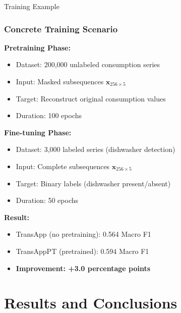 \documentclass{beamer}
\begin{document}
\begin{frame}{Training Example}
\frametitle{Concrete Training Scenario}

\textbf{Pretraining Phase:}
\begin{itemize}
    \item Dataset: 200,000 unlabeled consumption series
    \item Input: Masked subsequences $\mathbf{x}_{256 \times 5}$
    \item Target: Reconstruct original consumption values
    \item Duration: 100 epochs
\end{itemize}

\vspace{0.3cm}

\textbf{Fine-tuning Phase:}
\begin{itemize}
    \item Dataset: 3,000 labeled series (dishwasher detection)
    \item Input: Complete subsequences $\mathbf{x}_{256 \times 5}$
    \item Target: Binary labels (dishwasher present/absent)
    \item Duration: 50 epochs
\end{itemize}

\vspace{0.3cm}

\textbf{Result:} 
\begin{itemize}
    \item TransApp (no pretraining): 0.564 Macro F1
    \item TransAppPT (pretrained): 0.594 Macro F1
    \item \textbf{Improvement: +3.0 percentage points}
\end{itemize}

\end{frame}

\section{Results and Conclusions}
\end{document}

